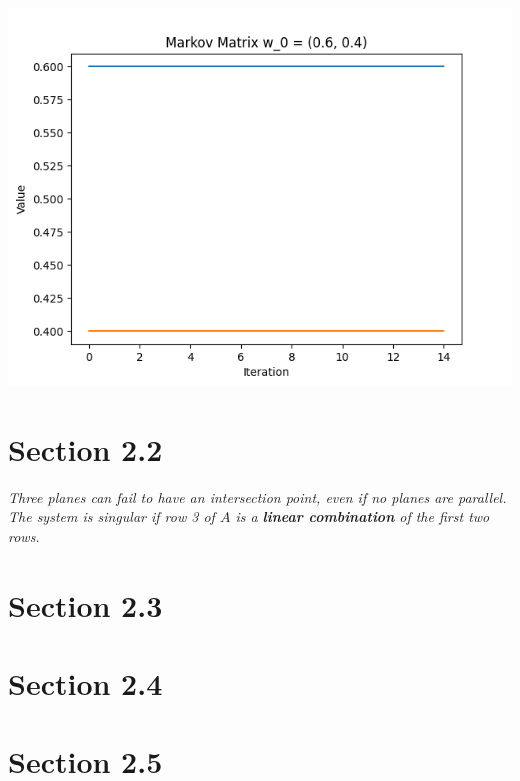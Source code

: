 \documentclass[12pt]{article}
\begin{document}
\begin{center}
    \includegraphics[scale=0.75]{s21p30c.png}
\end{center}

\section*{Section 2.2}

\emph{Three planes can fail to have an intersection point, even if no planes are parallel. The system is singular if row 3 of $A$ is a \textbf{linear combination} of the first two rows.}

\section*{Section 2.3}

\section*{Section 2.4}

\section*{Section 2.5}
\end{document}
